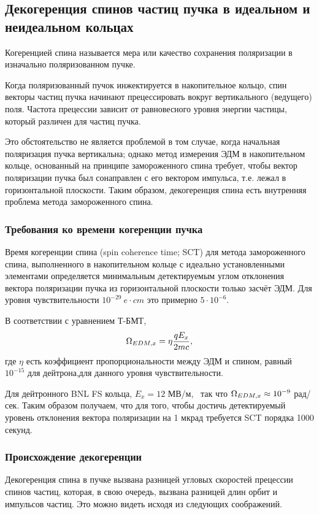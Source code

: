 \subsection{Декогеренция спинов частиц пучка в идеальном и неидеальном кольцах}
Когеренцией спина называется мера или качество сохранения поляризации
в изначально поляризованном пучке.~\cite[стр.~205]{Eremey:Thesis}

Когда поляризованный пучок инжектируется в накопительное кольцо, спин
векторы частиц пучка начинают прецессировать вокруг вертикального
(ведущего) поля. Частота прецессии зависит от равновесного уровня
энергии частицы, который различен для частиц пучка.

Это обстоятельство не является проблемой в том случае, когда начальная
поляризация пучка вертикальна; однако метод измерения ЭДМ в
накопительном кольце, основанный
на принципе замороженного спина требует, чтобы вектор поляризации
пучка был сонаправлен с его вектором импульса, т.е. лежал в
горизонтальной плоскости. Таким образом, декогеренция спина есть
внутренняя проблема метода замороженного спина.
\subsubsection{Требования ко времени когеренции пучка}
Время когеренции спина (spin coherence time; SCT) для метода
замороженного спина, выполненного в накопительном кольце с идеально
установленными элементами определяется минимальным детектируемым углом
отклонения вектора поляризации пучка из горизонтальной плоскости
только засчёт ЭДМ. Для уровня чувствительности $10^{-29}~e\cdot cm$
это примерно $5\cdot10^{-6}$.~\cite{BNL:Deuteron2008}

В соответствии с уравнением Т-БМТ,
\[
\Omega_{EDM,x} = \eta\frac{qE_x}{2mc},
\]
где $\eta$ есть коэффициент пропорциональности между ЭДМ и спином,
равный $10^{-15}$ для дейтрона,для данного уровня чувствительности.~\cite[стр.~206]{Eremey:Thesis}

Для дейтронного BNL FS кольца, $E_x = 12$
МВ/м,~\cite[стр.~19]{BNL:Deuteron2008} так что $\Omega_{EDM,x}\approx
10^{-9}$ рад/сек. Таким образом получаем, что для того, чтобы достичь
детектируемый уровень отклонения вектора поляризации на 1 мкрад требуется SCT порядка 1000 секунд.~\cite[стр.~207]{Eremey:Thesis}
\subsubsection{Происхождение декогеренции}
Декогеренция спина в пучке вызвана разницей угловых скоростей
прецессии спинов частиц, которая, в свою очередь, вызвана разницей
длин орбит и импульсов частиц. Это можно видеть исходя из следующих
соображений.

